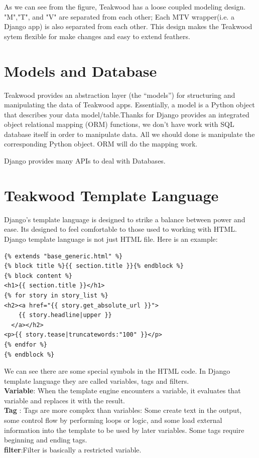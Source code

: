 As we can see from the figure, Teakwood has a loose coupled modeling design. "M","T", and "V" are separated from each other; Each MTV wrapper(i.e. a Django app) is also separated from each other. This design makes the Teakwood sytem flexible for make changes and easy to extend feathers.

\section{Models and Database}
Teakwood provides an abstraction layer (the “models”) for structuring and manipulating the data of Teakwood apps. Essentially, a model is a Python object that describes your data model/table.Thanks for Django provides an integrated object relational mapping (ORM) functions, we don't have work with SQL database  itself in order to manipulate data. All we should done is manipulate the corresponding Python object. ORM will do the mapping work.

Django provides many APIs to deal with Databases.

\section{Teakwood Template Language}
Django’s template language is designed to strike a balance between power and ease. Its designed to feel comfortable to those used to working with HTML. \\
Django template language is not just HTML file. Here is an example:
\begin{verbatim}
{% extends "base_generic.html" %}
{% block title %}{{ section.title }}{% endblock %}
{% block content %}
<h1>{{ section.title }}</h1>
{% for story in story_list %}
<h2><a href="{{ story.get_absolute_url }}">
    {{ story.headline|upper }}
  </a></h2>
<p>{{ story.tease|truncatewords:"100" }}</p>
{% endfor %}
{% endblock %}
\end{verbatim}

We can see there are some special symbols in the HTML code. In Django template language they are called variables, tags and filters.\\

\textbf{Variable}: When the template engine encounters a variable, it evaluates that variable and replaces it with the result.\\
\textbf{Tag }: Tags are more complex than variables: Some create text in the output, some control flow by performing loops or logic, and some load external information into the template to be used by later variables. Some tags require beginning and ending tags. \\
\textbf{filter}:Filter is basically a restricted variable.\\

